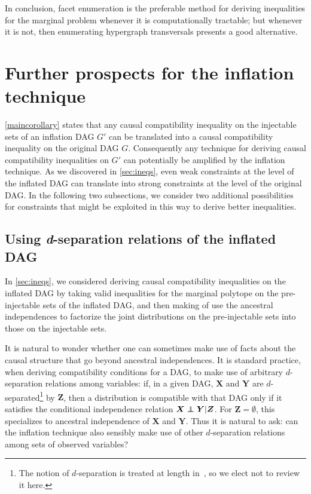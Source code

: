 {In conclusion, facet enumeration is the preferable method for deriving inequalities for the marginal problem whenever it is computationally tractable; but whenever it is not, then enumerating hypergraph transversals presents a good alternative. %





\section{Further prospects for the inflation technique}\label{sec:otherprospects}

\cref{maincorollary} states that any causal compatibility inequality on the injectable sets of an inflation DAG $G'$ can be translated into a causal compatibility inequality on the original DAG $G$. Consequently any technique for deriving causal compatibility inequalities on $G'$ can potentially be amplified by the inflation technique.  As we discovered in \cref{sec:ineqs}, even weak constraints at the level of the inflated DAG can translate into strong constraints at the level of the original DAG. In the following two subsections, we consider two additional possibilities for constraints that might be exploited in this way to derive better inequalities.

\subsection{Using \textit{d}-separation relations of the inflated DAG}\label{sec:fulldsep}

In \cref{sec:ineqs}, we considered deriving causal compatibility inequalities on the inflated DAG by taking valid inequalities for the marginal polytope on the pre-injectable sets of the inflated DAG, and then making of use the ancestral independences to factorize the joint distributions on the pre-injectable sets into those on the injectable sets.

It is natural to wonder whether one can sometimes make use of facts about the causal structure that go beyond ancestral independences.  It is standard practice, when deriving compatibility conditions for a DAG, to make use of arbitrary $d$-separation relations among variables: if, in a given DAG, $\bm{X}$ and $\bm{Y}$ are $d$-separated\footnote{The notion of $d$-separation is treated at length in~\cite{pearl2009causality,studeny2005probabilistic,WoodSpekkens,pusey2014gdag}, so we elect not to review it here.} by $\bm{Z}$, then a distribution is compatible with that DAG only if it satisfies the conditional independence relation $\bm{X}\perp\!\!\!\!\perp\bm{Y}|\bm{Z}$. For $\bm{Z} = \emptyset$, this specializes to ancestral independence of $\bm{X}$ and $\bm{Y}$. Thus it is natural to ask: can the inflation technique also sensibly make use of other $d$-separation relations among sets of observed variables?

}
